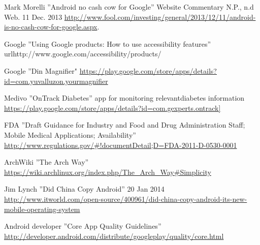 \documentclass[conference]{IEEEtran}
\begin{document}
\begin{thebibliography}{1}
Mark Morelli ''Android no cash cow for Google'' Website Commentary N.P., n.d Web. 11 Dec. 2013 \url{http://www.fool.com/investing/general/2013/12/11/android-is-no-cash-cow-for-google.aspx}.

Google ''Using Google products: How to use accessibility features'' url{http://www.google.com/accessibility/products/}

Google ''Din Magnifier" \url{https://play.google.com/store/apps/details?id=com.yuvalluzon.yourmagnifier}

Medivo ''OnTrack Diabetes'' app for monitoring relevantdiabetes information
\url{https://play.google.com/store/apps/details?id=com.gexperts.ontrack]}

FDA ''Draft Guidance for Industry and Food and Drug Administration Staff; Mobile Medical Applications; Availability''
\url{http://www.regulations.gov/#!documentDetail;D=FDA-2011-D-0530-0001}

ArchWiki ''The Arch Way'' \url{https://wiki.archlinux.org/index.php/The\_Arch\_Way#Simplicity}





Jim Lynch ''Did China Copy Android''  20 Jan 2014 \url{http://www.itworld.com/open-source/400961/did-china-copy-android-its-new-mobile-operating-system} 

Android developer ''Core App Quality Guidelines''
\url{http://developer.android.com/distribute/googleplay/quality/core.html}

\end{thebibliography}
\end{document}
